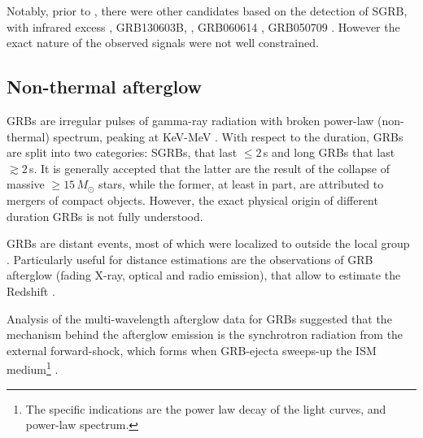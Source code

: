 Notably, prior to \AT{}, there were other candidates based on the 
detection of \ac{SGRB}, with infrared excess \eg, 
GRB130603B, \citep{Berger:2013wna,Tanvir:2013pia}, 
GRB060614 \citep{Jin:2015txa,Yang:2015pha}, 
GRB050709 \citep{Jin:2016pnm}.
However the exact nature of the observed signals were not well constrained. 


\subsection{Non-thermal afterglow}

\acp{GRB} are irregular pulses of gamma-ray radiation with broken power-law 
(non-thermal) spectrum, peaking at KeV-MeV \citep{Band:1993,Kouveliotou:1993,Meegan:1992xg}.
%
With respect to the duration, \acp{GRB} are split into two categories: \acp{SGRB}, 
that last ${\leq}2\,$s and long \acp{GRB} that last ${\gtrsim}2\,$s. 
%
It is generally accepted that the latter are the 
result of the collapse of massive ${\geq}15\,M_{\odot}$ stars,
 while the former, at least in part, are attributed to mergers of compact objects. 
%
However, the exact physical origin of different duration 
\acp{GRB} is not fully understood.
%

\acp{GRB} are distant events, most of which were localized to outside the local 
group \citep[\eg][]{Mao:1992,Piran:1992,Fenimore:1993}. 
%
Particularly useful for distance estimations are the observations of \ac{GRB} afterglow
(fading X-ray, optical and radio emission), 
that allow to estimate the Redshift \citep[\eg][]{Costa:1997cg,Frontera:1997ae}.

Analysis of the multi-wavelength afterglow data for \acp{GRB} 
\citep[\eg][]{Panaitescu:2001bx} suggested that the mechanism behind the afterglow 
emission is the synchrotron radiation from the external forward-shock, which forms 
when \ac{GRB}-ejecta sweeps-up the \ac{ISM} medium\footnote{
    The specific indications are the power law decay of the light curves, 
    and power-law spectrum. 
} 
\citep{Rees:1992ek,Paczynski:1993gz,Meszaros:1993ju,Meszaros:1996sv}.
%

